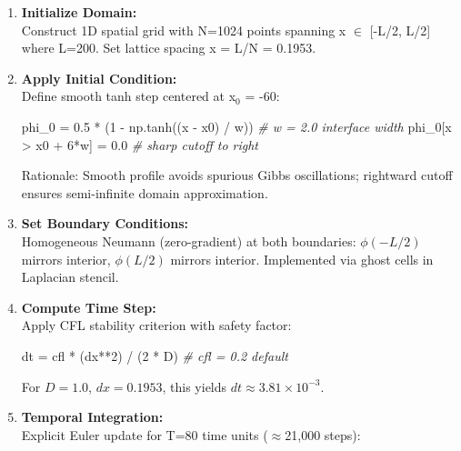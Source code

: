 \documentclass[
]{article}
\newenvironment{Shaded}{}{}
\newcommand{\CommentTok}[1]{\textcolor[rgb]{0.38,0.63,0.69}{\textit{#1}}}
\newcommand{\DecValTok}[1]{\textcolor[rgb]{0.25,0.63,0.44}{#1}}
\newcommand{\FloatTok}[1]{\textcolor[rgb]{0.25,0.63,0.44}{#1}}
\newcommand{\NormalTok}[1]{#1}
\newcommand{\OperatorTok}[1]{\textcolor[rgb]{0.40,0.40,0.40}{#1}}
\begin{document}
\begin{enumerate}
\def\labelenumi{\arabic{enumi}.}
\item
  \textbf{Initialize Domain:}\\
  Construct 1D spatial grid with N=1024 points spanning x $\in$ {[}-L/2,
  L/2{]} where L=200. Set lattice spacing \Delta x = L/N = 0.1953.
\item
  \textbf{Apply Initial Condition:}\\
  Define smooth tanh step centered at x$_0$ = -60:

\begin{Shaded}
\begin{Highlighting}[]
\NormalTok{phi\_0 }\OperatorTok{=} \FloatTok{0.5} \OperatorTok{*}\NormalTok{ (}\DecValTok{1} \OperatorTok{{-}}\NormalTok{ np.tanh((x }\OperatorTok{{-}}\NormalTok{ x0) }\OperatorTok{/}\NormalTok{ w))  }\CommentTok{\# w = 2.0 interface width}
\NormalTok{phi\_0[x }\OperatorTok{\textgreater{}}\NormalTok{ x0 }\OperatorTok{+} \DecValTok{6}\OperatorTok{*}\NormalTok{w] }\OperatorTok{=} \FloatTok{0.0}  \CommentTok{\# sharp cutoff to right}
\end{Highlighting}
\end{Shaded}

  Rationale: Smooth profile avoids spurious Gibbs oscillations;
  rightward cutoff ensures semi-infinite domain approximation.
\item
  \textbf{Set Boundary Conditions:}\\
  Homogeneous Neumann (zero-gradient) at both boundaries: \(\phi(-L/2)\)
  mirrors interior, \(\phi(L/2)\) mirrors interior. Implemented via
  ghost cells in Laplacian stencil.
\item
  \textbf{Compute Time Step:}\\
  Apply CFL stability criterion with safety factor:

\begin{Shaded}
\begin{Highlighting}[]
\NormalTok{dt }\OperatorTok{=}\NormalTok{ cfl }\OperatorTok{*}\NormalTok{ (dx}\OperatorTok{**}\DecValTok{2}\NormalTok{) }\OperatorTok{/}\NormalTok{ (}\DecValTok{2} \OperatorTok{*}\NormalTok{ D)  }\CommentTok{\# cfl = 0.2 default}
\end{Highlighting}
\end{Shaded}

  For \(D=1.0\), \(dx=0.1953\), this yields
  \(dt \approx 3.81\times 10^{-3}\).
\item
  \textbf{Temporal Integration:}\\
  Explicit Euler update for T=80 time units ($\approx$21,000 steps):


\end{enumerate}
\end{document}

